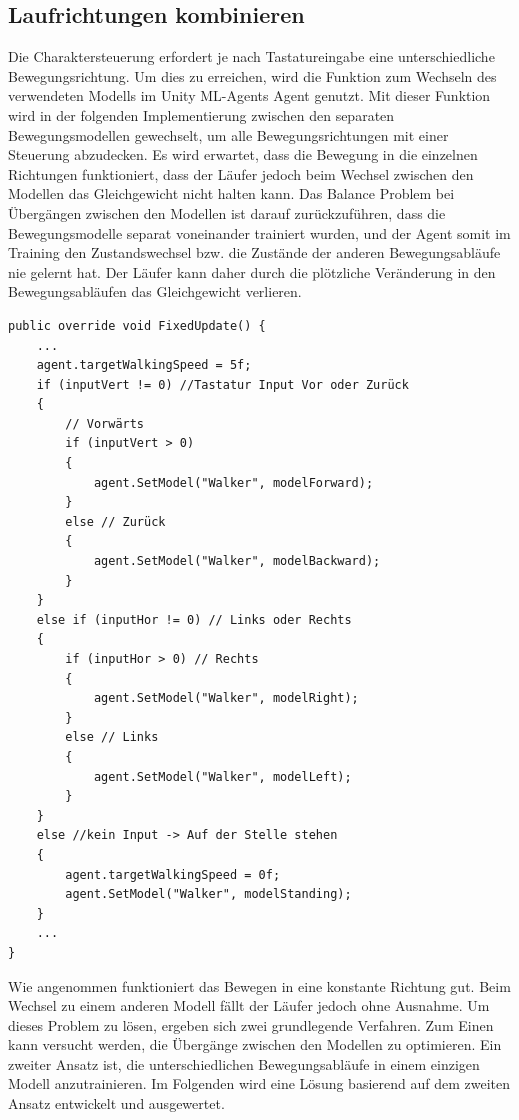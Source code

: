 \subsection{Laufrichtungen kombinieren}
Die Charaktersteuerung erfordert je nach Tastatureingabe eine unterschiedliche Bewegungsrichtung. Um dies zu erreichen, wird die Funktion zum Wechseln des verwendeten Modells im Unity ML-Agents Agent genutzt. Mit dieser Funktion wird in der folgenden Implementierung zwischen den separaten Bewegungsmodellen gewechselt, um alle Bewegungsrichtungen mit einer Steuerung abzudecken. Es wird erwartet, dass die Bewegung in die einzelnen Richtungen funktioniert, dass der Läufer jedoch beim Wechsel zwischen den Modellen das Gleichgewicht nicht halten kann. Das Balance Problem bei Übergängen zwischen den Modellen ist darauf zurückzuführen, dass die Bewegungsmodelle separat voneinander trainiert wurden, und der Agent somit im Training den Zustandswechsel bzw. die Zustände der anderen Bewegungsabläufe nie gelernt hat. Der Läufer kann daher durch die plötzliche Veränderung in den Bewegungsabläufen das Gleichgewicht verlieren.

\begin{lstlisting}[caption={Laufrichtung Modell wechseln},captionpos=b,label={lst:laufrichtung_modell_wechsel}]
public override void FixedUpdate() {
    ...    
    agent.targetWalkingSpeed = 5f;
    if (inputVert != 0) //Tastatur Input Vor oder Zurück
    {
        // Vorwärts
        if (inputVert > 0)
        {
            agent.SetModel("Walker", modelForward);
        }
        else // Zurück
        {
            agent.SetModel("Walker", modelBackward);
        }
    }
    else if (inputHor != 0) // Links oder Rechts
    {
        if (inputHor > 0) // Rechts
        {
            agent.SetModel("Walker", modelRight);
        }
        else // Links
        {
            agent.SetModel("Walker", modelLeft);
        }
    }
    else //kein Input -> Auf der Stelle stehen
    {
        agent.targetWalkingSpeed = 0f;
        agent.SetModel("Walker", modelStanding);
    }
    ...
}
\end{lstlisting}

Wie angenommen funktioniert das Bewegen in eine konstante Richtung gut. Beim Wechsel zu einem anderen Modell fällt der Läufer jedoch ohne Ausnahme. Um dieses Problem zu lösen, ergeben sich zwei grundlegende Verfahren. Zum Einen kann versucht werden, die Übergänge zwischen den Modellen zu optimieren. Ein zweiter Ansatz ist, die unterschiedlichen Bewegungsabläufe in einem einzigen Modell anzutrainieren. Im Folgenden wird eine Lösung basierend auf dem zweiten Ansatz entwickelt und ausgewertet.

